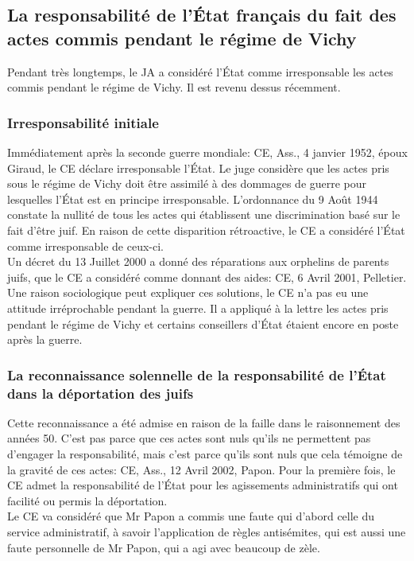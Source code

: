 \documentclass[10pt, a4paper, openany]{book}
\begin{document}
\subsection{La responsabilité de l'État français du fait des actes commis pendant le régime de Vichy}

Pendant très longtemps, le JA a considéré l'État comme irresponsable les actes commis pendant le régime de Vichy. Il est revenu dessus récemment.

\subsubsection{Irresponsabilité initiale}

Immédiatement après la seconde guerre mondiale: CE, Ass., 4 janvier 1952, époux Giraud, le CE déclare irresponsable l'État. Le juge considère que les actes pris sous le régime de Vichy doit être assimilé à des dommages de guerre pour lesquelles l'État est en principe irresponsable. L'ordonnance du 9 Août 1944 constate la nullité de tous les actes qui établissent une discrimination basé sur le fait d'être juif. En raison de cette disparition rétroactive, le CE a considéré l'État comme irresponsable de ceux-ci. \\
Un décret du 13 Juillet 2000 a donné des réparations aux orphelins de parents juifs, que le CE a considéré comme donnant des aides: CE, 6 Avril 2001, Pelletier. \\
Une raison sociologique peut expliquer ces solutions, le CE n'a pas eu une attitude irréprochable pendant la guerre. Il a appliqué à la lettre les actes pris pendant le régime de Vichy et certains conseillers d'État étaient encore en poste après la guerre. 


\subsubsection{La reconnaissance solennelle de la responsabilité de l'État dans la déportation des juifs}

Cette reconnaissance a été admise en raison de la faille dans le raisonnement des années 50. C'est pas parce que ces actes sont nuls qu'ils ne permettent pas d'engager la responsabilité, mais c'est parce qu'ils sont nuls que cela témoigne de la gravité de ces actes: CE, Ass., 12 Avril 2002, Papon. Pour la première fois, le CE admet la responsabilité de l'État pour les agissements administratifs qui ont facilité ou permis la déportation. \\
Le CE va considéré que Mr Papon a commis une faute qui d'abord celle du service administratif, à savoir l'application de règles antisémites, qui est aussi une faute personnelle de Mr Papon, qui a agi avec beaucoup de zèle. 
\end{document}

